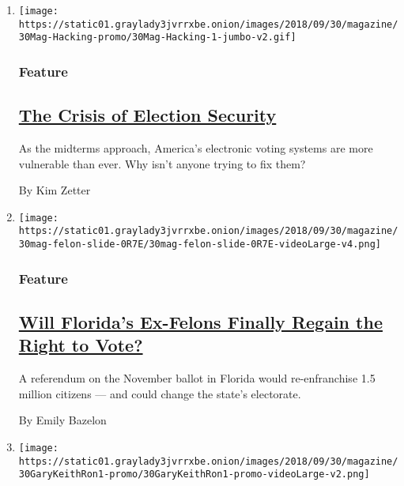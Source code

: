 \begin{enumerate}
\def\labelenumi{\arabic{enumi}.}
\item
  \texttt{[image: https://static01.graylady3jvrrxbe.onion/images/2018/09/30/magazine/30Mag-Hacking-promo/30Mag-Hacking-1-jumbo-v2.gif]}

  \hypertarget{feature}{%
  \subsubsection{Feature}\label{feature}}

  \hypertarget{the-crisis-of-election-security}{%
  \subsection{\texorpdfstring{\href{/2018/09/26/magazine/election-security-crisis-midterms.html}{The
  Crisis of Election
  Security}}{The Crisis of Election Security}}\label{the-crisis-of-election-security}}

  As the midterms approach, America's electronic voting systems are more
  vulnerable than ever. Why isn't anyone trying to fix them?

  By Kim Zetter
\item
  \texttt{[image: https://static01.graylady3jvrrxbe.onion/images/2018/09/30/magazine/30mag-felon-slide-0R7E/30mag-felon-slide-0R7E-videoLarge-v4.png]}

  \hypertarget{feature-1}{%
  \subsubsection{Feature}\label{feature-1}}

  \hypertarget{will-floridas-ex-felons-finally-regain-the-right-to-vote}{%
  \subsection{\texorpdfstring{\href{/2018/09/26/magazine/ex-felons-voting-rights-florida.html}{Will
  Florida's Ex-Felons Finally Regain the Right to
  Vote?}}{Will Florida's Ex-Felons Finally Regain the Right to Vote?}}\label{will-floridas-ex-felons-finally-regain-the-right-to-vote}}

  A referendum on the November ballot in Florida would re-enfranchise
  1.5 million citizens --- and could change the state's electorate.

  By Emily Bazelon
\item
  \texttt{[image: https://static01.graylady3jvrrxbe.onion/images/2018/09/30/magazine/30GaryKeithRon1-promo/30GaryKeithRon1-promo-videoLarge-v2.png]}


\end{enumerate}
